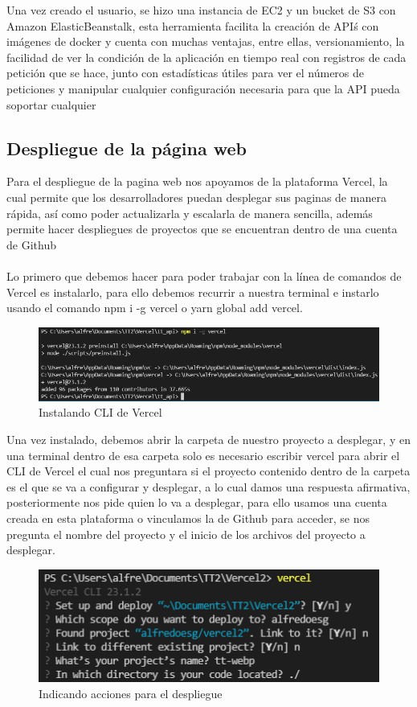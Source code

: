 \documentclass[12pt, a4paper, titlepage]{report}
\begin{document}
Una vez creado el usuario, se hizo una instancia de EC2 y un bucket de S3 con Amazon ElasticBeanstalk, esta herramienta facilita la creación de API\'s con imágenes de docker y cuenta con muchas ventajas, entre ellas, versionamiento, la facilidad de ver la condición de la aplicación en tiempo real con registros de cada petición que se hace, junto con estadísticas útiles para ver el números de peticiones y manipular cualquier configuración necesaria para que la API pueda soportar cualquier


\subsection{Despliegue de la página web}

Para el despliegue de la pagina web nos apoyamos de la plataforma Vercel, la cual permite que los desarrolladores puedan desplegar sus paginas de manera rápida, así como poder actualizarla y escalarla de manera sencilla, además permite hacer despliegues de proyectos que se encuentran dentro de una cuenta de Github\\\\
Lo primero que debemos hacer para poder trabajar con la línea de comandos de Vercel es instalarlo, para ello debemos recurrir a nuestra terminal e instarlo usando el comando npm i -g vercel o yarn global add vercel.
\begin{figure}[H]
	\includegraphics[width=12cm]{./imagenes/Desarrollo/Despliegue/Instalacion.png}
	\centering 
	\caption{Instalando CLI de Vercel}
\end{figure}
Una vez instalado, debemos abrir la carpeta de nuestro proyecto a desplegar, y en una terminal dentro de esa carpeta solo es necesario escribir vercel para abrir el CLI de Vercel el cual nos preguntara si el proyecto contenido dentro de la carpeta es el que se va a configurar y desplegar, a lo cual damos una respuesta afirmativa, posteriormente nos pide quien lo va a desplegar, para ello usamos una cuenta creada en esta plataforma o vinculamos la de Github para acceder, se nos pregunta el nombre del proyecto y el inicio de los archivos del proyecto a desplegar.
\begin{figure}[H]
	\includegraphics[width=12cm]{./imagenes/Desarrollo/Despliegue/Acciones.png}
	\centering 
	\caption{Indicando acciones para el despliegue}
\end{figure}
\end{document}

